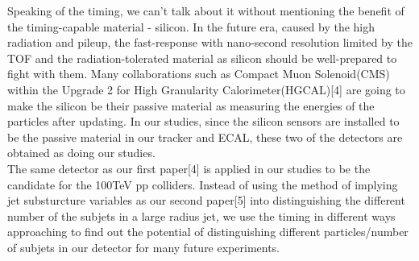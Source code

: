 \documentclass[final,1p,11pt]{elsarticle}
\begin{document}
Speaking of the timing, we can't talk about it without mentioning the benefit of the timing-capable material - silicon. In the future era, caused by the high radiation and pileup, the fast-response with nano-second resolution limited by the TOF and the radiation-tolerated material as silicon should be well-prepared to fight with them. Many collaborations such as Compact Muon Solenoid(CMS) within the Upgrade 2 for High Granularity Calorimeter(HGCAL)[4] are going to make the silicon be their passive material as measuring the energies of the particles after updating. In our studies, since the silicon sensors are installed to be the passive material in our tracker and ECAL, these two of the detectors are obtained as doing our studies.\\

The same detector as our first paper[4] is applied in our studies to be the candidate for the 100TeV pp colliders. Instead of using the method of implying jet substurcture variables as our second paper[5] into distinguishing the different number of the subjets in a large radius jet, we use the timing in different ways approaching to find out the potential of distinguishing different particles/number of subjets in our detector for many future experiments.\\








\newpage

%
%
\end{document}
